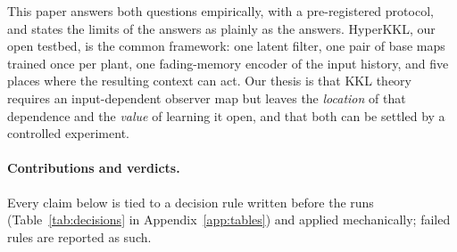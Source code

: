 This paper answers both questions empirically, with a pre-registered protocol, and states the limits of the answers as plainly as the answers. HyperKKL, our open testbed, is the common framework: one latent filter, one pair of base maps trained once per plant, one fading-memory encoder of the input history, and five places where the resulting context can act. Our thesis is that KKL theory requires an input-dependent observer map but leaves the \emph{location} of that dependence and the \emph{value} of learning it open, and that both can be settled by a controlled experiment.

\paragraph{Contributions and verdicts.} Every claim below is tied to a decision rule written before the runs (Table~\ref{tab:decisions} in Appendix~\ref{app:tables}) and applied mechanically; failed rules are reported as such.
